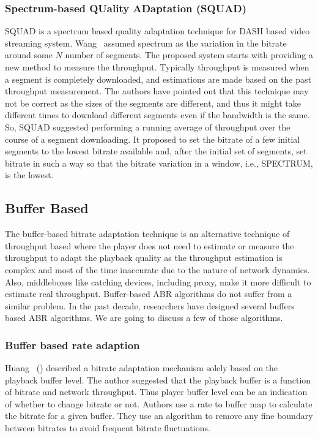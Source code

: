 \subsubsection{Spectrum-based QUality ADaptation (SQUAD)}
SQUAD\cite{10.1145/2910017.2910593} is a spectrum\cite{1386243} based quality adaptation technique for DASH based video streaming system. Wang \etal\ assumed spectrum as the variation in the bitrate around some $N$ number of segments. The proposed system starts with providing a new method to measure the throughput. Typically throughput is measured when a segment is completely downloaded, and estimations are made based on the past throughput measurement. The authors have pointed out that this technique may not be correct as the sizes of the segments are different, and thus it might take different times to download different segments even if the bandwidth is the same. So, SQUAD suggested performing a running average of throughput over the course of a segment downloading. It proposed to set the bitrate of a few initial segments to the lowest bitrate available and, after the initial set of segments, set bitrate in such a way so that the bitrate variation in a window, i.e., SPECTRUM, is the lowest.


\subsection{Buffer Based}
The buffer-based bitrate adaptation technique is an alternative technique of throughput based where the player does not need to estimate or measure the throughput to adapt the playback quality as the throughput estimation is complex and most of the time inaccurate due to the nature of network dynamics. Also, middleboxes like catching devices, including proxy, make it more difficult to estimate real throughput. Buffer-based ABR algorithms do not suffer from a similar problem. In the past decade, researchers have designed several buffers based ABR algorithms. We are going to discuss a few of those algorithms.

\subsubsection{Buffer based rate adaption}
Huang \etal\ (\cite{Huang2014,10.1145/2398776.2398800,10.1145/2491172.2491179}) described a bitrate adaptation mechanism solely based on the playback buffer level. The author suggested that the playback buffer is a function of bitrate and network throughput. Thus player buffer level can be an indication of whether to change bitrate or not. Authors use a rate to buffer map to calculate the bitrate for a given buffer. They use an algorithm to remove any fine boundary between bitrates to avoid frequent bitrate fluctuations.

